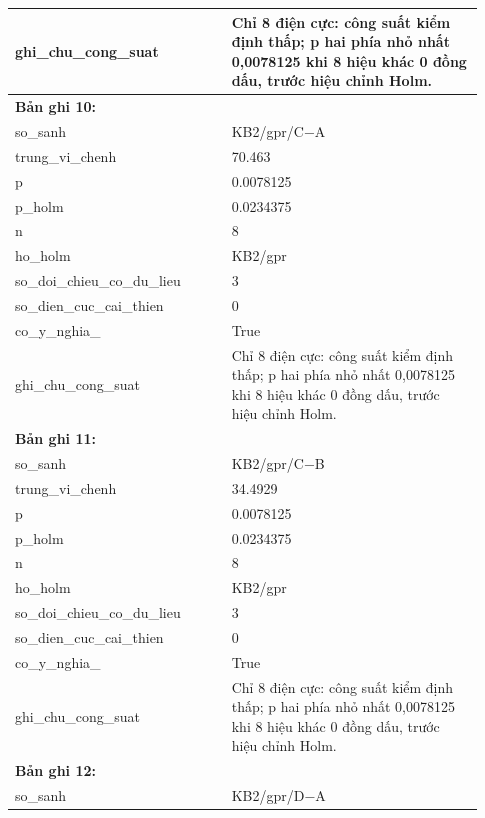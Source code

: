 \begin{longtable}{p{0.43\linewidth}p{0.50\linewidth}}
ghi\_\allowbreak chu\_\allowbreak cong\_\allowbreak suat & Chỉ 8 điện cực: công suất kiểm định thấp; p hai phía nhỏ nhất 0,0078125 khi 8 hiệu khác 0 đồng dấu, trước hiệu chỉnh Holm. \\
\midrule
\multicolumn{2}{p{0.95\linewidth}}{\textbf{Bản ghi 10: }} \\
so\_\allowbreak sanh & KB2/gpr/C−A \\
trung\_\allowbreak vi\_\allowbreak chenh & 70.463 \\
p & 0.0078125 \\
p\_\allowbreak holm & 0.0234375 \\
n & 8 \\
ho\_\allowbreak holm & KB2/gpr \\
so\_\allowbreak doi\_\allowbreak chieu\_\allowbreak co\_\allowbreak du\_\allowbreak lieu & 3 \\
so\_\allowbreak dien\_\allowbreak cuc\_\allowbreak cai\_\allowbreak thien & 0 \\
co\_\allowbreak y\_\allowbreak nghia\_\allowbreak 005 & True \\
ghi\_\allowbreak chu\_\allowbreak cong\_\allowbreak suat & Chỉ 8 điện cực: công suất kiểm định thấp; p hai phía nhỏ nhất 0,0078125 khi 8 hiệu khác 0 đồng dấu, trước hiệu chỉnh Holm. \\
\midrule
\multicolumn{2}{p{0.95\linewidth}}{\textbf{Bản ghi 11: }} \\
so\_\allowbreak sanh & KB2/gpr/C−B \\
trung\_\allowbreak vi\_\allowbreak chenh & 34.4929 \\
p & 0.0078125 \\
p\_\allowbreak holm & 0.0234375 \\
n & 8 \\
ho\_\allowbreak holm & KB2/gpr \\
so\_\allowbreak doi\_\allowbreak chieu\_\allowbreak co\_\allowbreak du\_\allowbreak lieu & 3 \\
so\_\allowbreak dien\_\allowbreak cuc\_\allowbreak cai\_\allowbreak thien & 0 \\
co\_\allowbreak y\_\allowbreak nghia\_\allowbreak 005 & True \\
ghi\_\allowbreak chu\_\allowbreak cong\_\allowbreak suat & Chỉ 8 điện cực: công suất kiểm định thấp; p hai phía nhỏ nhất 0,0078125 khi 8 hiệu khác 0 đồng dấu, trước hiệu chỉnh Holm. \\
\midrule
\multicolumn{2}{p{0.95\linewidth}}{\textbf{Bản ghi 12: }} \\
so\_\allowbreak sanh & KB2/gpr/D−A \\

\end{longtable}
